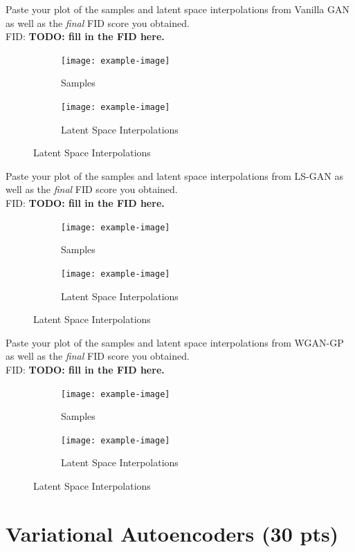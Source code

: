 \documentclass[11pt,addpoints,answers]{exam}
\numberwithin{equation}{section} %
\numberwithin{figure}{section} %
\numberwithin{table}{section} %
\begin{document}
\begin{questions}
\question Paste your plot of the samples and latent space interpolations from Vanilla GAN as well as the \textit{final} FID score you obtained. 
\\
FID: \textbf{TODO: fill in the FID here.} 
\begin{figure}[H]
    \centering
    \begin{subfigure}[b]{0.32\linewidth}
        \texttt{[image: example-image]}
        \caption{Samples}
    \end{subfigure}
    \begin{subfigure}[b]{0.32\linewidth}
        \texttt{[image: example-image]}
        \caption{Latent Space Interpolations}
    \end{subfigure}
\end{figure}
\question Paste your plot of the samples and latent space interpolations from LS-GAN as well as the \textit{final} FID score you obtained. 
\\
FID: \textbf{TODO: fill in the FID here.} 
\begin{figure}[H]
    \centering
    \begin{subfigure}[b]{0.32\linewidth}
        \texttt{[image: example-image]}
        \caption{Samples}
    \end{subfigure}
    \begin{subfigure}[b]{0.32\linewidth}
        \texttt{[image: example-image]}
        \caption{Latent Space Interpolations}
    \end{subfigure}
\end{figure}
\question Paste your plot of the samples and latent space interpolations from WGAN-GP as well as the \textit{final} FID score you obtained. 
\\
FID: \textbf{TODO: fill in the FID here.} 
\begin{figure}[H]
    \centering
    \begin{subfigure}[b]{0.32\linewidth}
        \texttt{[image: example-image]}
        \caption{Samples}
    \end{subfigure}
    \begin{subfigure}[b]{0.32\linewidth}
        \texttt{[image: example-image]}
        \caption{Latent Space Interpolations}
    \end{subfigure}
\end{figure}    
\end{questions}
\clearpage

\section{Variational Autoencoders (30 pts)}
\end{document}
